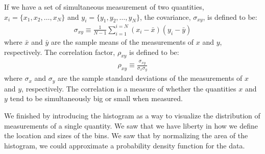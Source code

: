 If we have a set of simultaneous measurement of two quantities, $x_i=\{x_1, x_2,\dots, x_N\}$ and $y_i=\{y_1, y_2,\dots, y_N\}$, the covariance, $\sigma_{xy}$, is defined to be:
\begin{align}
\sigma_{xy}\equiv\frac{1}{N-1}\sum_{i=1}^{i=N}(x_i-\bar x)(y_i-\bar y)
\end{align}
where $\bar x$ and $\bar y$ are the sample means of the measurements of $x$ and $y$, respectively. The correlation factor, $\rho_{xy}$ is defined to be:
\begin{align}
\rho_{xy}\equiv\frac{\sigma_{xy}}{\sigma_x\sigma_y}
\end{align}
where $\sigma_x$ and $\sigma_y$ are the sample standard deviations of the measurements of $x$ and $y$, respectively. The correlation is a measure of whether the quantities $x$ and $y$ tend to be simultaneously big or small when measured.

We finished by introducing the histogram as a way to visualize the distribution of measurements of a single quantity. We saw that we have liberty in how we define the location and sizes of the bins. We saw that by normalizing the area of the histogram, we could approximate a probability density function for the data.